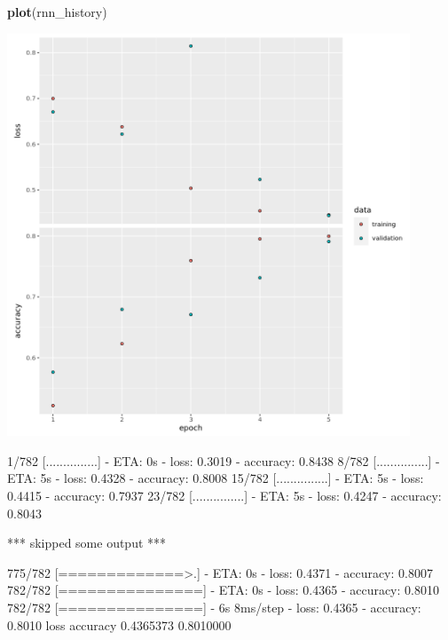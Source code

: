 \documentclass[12pt,]{krantz}
\makeatletter
\newenvironment{Shaded}{\begin{snugshade}}{\end{snugshade}}
\newcommand{\KeywordTok}[1]{\textcolor[rgb]{0.27,0.27,0.27}{\textbf{#1}}}
\newcommand{\NormalTok}[1]{#1}
\newcommand{\OperatorTok}[1]{\textcolor[rgb]{0.43,0.43,0.43}{\textbf{#1}}}
\newcommand{\StringTok}[1]{\textcolor[rgb]{0.5,0.5,0.5}{#1}}
\newenvironment{kframe}{%
\medskip{}
\setlength{\fboxsep}{.8em}
 \def\at@end@of@kframe{}%
 \ifinner\ifhmode%
  \def\at@end@of@kframe{\end{minipage}}%
  \begin{minipage}{\columnwidth}%
 \fi\fi%
 \def\FrameCommand##1{\hskip\@totalleftmargin \hskip-\fboxsep
 \colorbox{shadecolor}{##1}\hskip-\fboxsep
     \hskip-\linewidth \hskip-\@totalleftmargin \hskip\columnwidth}%
 \MakeFramed {\advance\hsize-\width
   \@totalleftmargin\z@ \linewidth\hsize
   \@setminipage}}%
 {\par\unskip\endMakeFramed%
 \at@end@of@kframe}
\renewenvironment{Shaded}{\begin{kframe}}{\end{kframe}}
\makeatother
\begin{document}
\begin{Shaded}
\begin{Highlighting}[]
\KeywordTok{plot}\NormalTok{(rnn_history)}
\end{Highlighting}
\end{Shaded}

\includegraphics[width=0.9\textwidth,height=\textheight]{images/rnnhandson1.png}

\begin{Shaded}
\end{Shaded}

\begin{Shaded}
\begin{Highlighting}[]
\NormalTok{  1/782 [...............] - ETA: 0s - loss: 0.3019 - accuracy: 0.8438}
\NormalTok{  8/782 [...............] - ETA: 5s - loss: 0.4328 - accuracy: 0.8008}
\NormalTok{ 15/782 [...............] - ETA: 5s - loss: 0.4415 - accuracy: 0.7937}
\NormalTok{ 23/782 [...............] - ETA: 5s - loss: 0.4247 - accuracy: 0.8043}

\NormalTok{*** skipped some output ***}

\NormalTok{775/782 [=============>.] - ETA: 0s - loss: 0.4371 - accuracy: 0.8007}
\NormalTok{782/782 [===============] - ETA: 0s - loss: 0.4365 - accuracy: 0.8010}
\NormalTok{782/782 [===============] - 6s 8ms/step - loss: 0.4365 - accuracy: 0.8010}
\NormalTok{     loss  accuracy }
\NormalTok{0.4365373 0.8010000 }
\end{Highlighting}
\end{Shaded}
\end{document}
